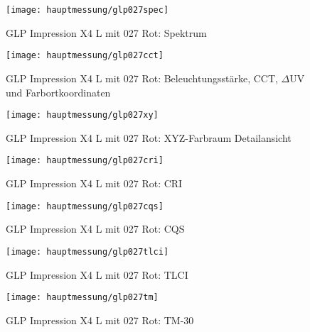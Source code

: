 \documentclass[pagesize,paper=A4,fontsize=12pt,utf8,numbers=noenddot,bibliography=totoc,listof=totoc,DIV=11,BCOR=1mm]{scrreprt}
\begin{document}
\begin{figure}[htp]     %
\centering
\texttt{[image: hauptmessung/glp027spec]} 
\caption {GLP Impression X4 L mit 027 Rot: Spektrum} 
\end{figure}

\begin{figure}[htp]     %
\centering
\texttt{[image: hauptmessung/glp027cct]} 
\caption {GLP Impression X4 L mit 027 Rot: Beleuchtungsstärke, CCT, $\Delta$UV und Farbortkoordinaten} 
\end{figure}

\begin{figure}[htp]     %
\centering
\texttt{[image: hauptmessung/glp027xy]} 
\caption {GLP Impression X4 L mit 027 Rot: XYZ-Farbraum Detailansicht} 
\end{figure}

\begin{figure}[htp]     %
\centering
\texttt{[image: hauptmessung/glp027cri]} 
\caption {GLP Impression X4 L mit 027 Rot: CRI} 
\end{figure}

\begin{figure}[htp]     %
\centering
\texttt{[image: hauptmessung/glp027cqs]} 
\caption {GLP Impression X4 L mit 027 Rot: CQS} 
\end{figure}

\begin{figure}[htp]     %
\centering
\texttt{[image: hauptmessung/glp027tlci]} 
\caption {GLP Impression X4 L mit 027 Rot: TLCI} 
\end{figure}

\begin{figure}[htp]     %
\centering
\texttt{[image: hauptmessung/glp027tm]} 
\caption {GLP Impression X4 L mit 027 Rot: TM-30} 
\end{figure}
\end{document}
